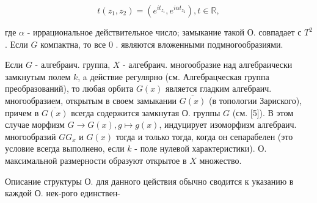 \documentclass[10pt]{article}
\begin{document}
\[
t\left(z_{1}, z_{2}\right)=\left(e^{i t_{z_{1}}}, e^{i \alpha t_{z_{2}}}\right), t \in \mathbb{R},
\]

где $\alpha$ - иррациональное действительное число; замыкание такой $О$. совпадает с $T^{2}$. Если $G$ компактна, то все 0 . являются вложенными подмногообразиями.

Если $G$ - алгебраич. группа, $X$ - алгебраич. многообразие над алгебраически замкнутым полем $k$, a действие регулярно (см. Алгебрацческая группа преобразований), то любая орбита $G(x)$ является гладким алгебраич. многообразием, открытым в своем замыкании $\overline{G(x)}$ (в топологии Зариского), причем в $\overline{G(x)}$ всегда содержится замкнутая О. группы $G$ (см. [5]). В этом случае морфизм $G \rightarrow G(x), g \mapsto g(x)$, индуцирует изоморфизм алгебраич. многообразий $G G_{x}$ и $G(x)$ тогда и только тогда, когда он сепарабелен (это условие всегда выполнено, если $k$ - поле нулевой характеристики). О. максимальной размерности образуют открытое в $X$ множество.

Описание структуры О. для данного цействия обычно сводится к указанию в каждой О. нек-рого единствен-
\end{document}
